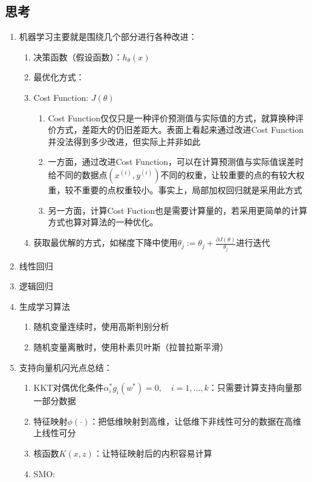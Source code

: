 \subsection{思考}
{\color{red}{以下内容均为个人的思考，不一定是正确的。}}
\begin{enumerate}
	\item 机器学习主要就是围绕几个部分进行各种改进：
	\begin{enumerate}
		\item 决策函数（假设函数）：$h_\theta(x)$
		\item 最优化方式：
		\item Cost Function: $J(\theta)$
			\begin{enumerate}
				\item Cost Function仅仅只是一种评价预测值与实际值的方式，就算换种评价方式，差距大的仍旧差距大。表面上看起来通过改进Cost Function并没法得到多少改进，但实际上并非如此
				\item 一方面，通过改进Cost Function，可以在计算预测值与实际值误差时给不同的数据点$(x^{(i)}, y^{(i)})$不同的权重，让较重要的点的有较大权重，较不重要的点权重较小。事实上，局部加权回归就是采用此方式
				\item 另一方面，计算Cost Fuction也是需要计算量的，若采用更简单的计算方式也算对算法的一种优化。{\color{gray}{暂未找到实例}}
			\end{enumerate}
		\item 获取最优解的方式，如梯度下降中使用$\theta_j := \theta_j + \frac{\partial J(\theta)}{\theta_j}$进行迭代
	\end{enumerate}

	\item 线性回归

	\item 逻辑回归

	\item 生成学习算法
	\begin{enumerate}
		\item 随机变量连续时，使用高斯判别分析
		\item 随机变量离散时，使用朴素贝叶斯（拉普拉斯平滑）
	\end{enumerate}


	\item 支持向量机闪光点总结：
	\begin{enumerate}
		\item KKT对偶优化条件$\alpha_i^*g_i(w^*) = 0, \quad i=1, \dots, k$：只需要计算支持向量那一部分数据
		\item 特征映射$\phi(\cdot)$：把低维映射到高维，让低维下非线性可分的数据在高维上线性可分
		\item 核函数$K(x,z)$：让特征映射后的内积容易计算
		\item SMO: 
	\end{enumerate}

\end{enumerate}
















